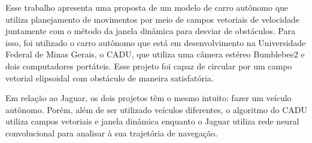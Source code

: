 Esse trabalho apresenta uma proposta de um modelo de carro autônomo que utiliza planejamento de movimentos por meio de campos vetoriais de velocidade juntamente com o método da janela dinâmica para desviar de obstáculos. Para isso, foi utilizado o carro autônomo que está em desenvolvimento na Universidade Federal de Minas Gerais, o CADU, que utiliza uma câmera estéreo Bumblebee2 e dois computadores portáteis. Esse projeto foi capaz de circular por um campo vetorial elipsoidal com obstáculo de maneira satisfatória. \cite{marcatto2014desenvolvimento}

Em relação ao Jaguar, os dois projetos têm o mesmo intuito: fazer um veículo autônomo. Porém, além de ser utilizado veículos diferentes, o algoritmo do CADU utiliza campos vetoriais e janela dinâmica enquanto o Jaguar utiliza rede neural convolucional para analisar à sua trajetória de navegação.

\begin{comment}
\Gls{ambiguidade}
\Gls{braile}
\Gls{coerencia}
\Gls{dialetos}
\Gls{elipse}
\Gls{locucao-adjetiva}
\Gls{modificadores}
\Gls{paronimos}
\Gls{sintese}
\Gls{borboleta}
\end{comment}